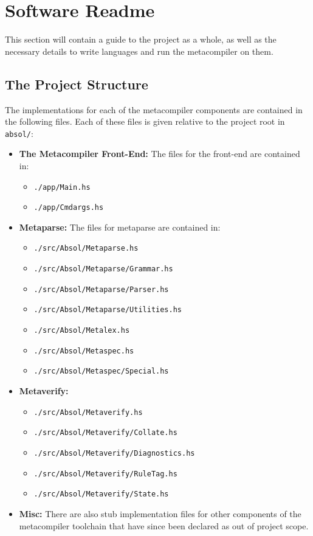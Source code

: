 \chapter{Software Readme} %
\label{cha:software_readme}
This section will contain a guide to the project as a whole, as well as the necessary details to write languages and run the metacompiler on them.

\section{The Project Structure} %
\label{sec:the_project_structure}
The implementations for each of the metacompiler components are contained in the following files. 
Each of these files is given relative to the project root in \texttt{absol/}:
\begin{itemize}
    \item \textbf{The Metacompiler Front-End:} The files for the front-end are contained in:
    \begin{itemize}
        \item \texttt{./app/Main.hs}
        \item \texttt{./app/Cmdargs.hs}
    \end{itemize}
    \item \textbf{Metaparse:} The files for metaparse are contained in:
    \begin{itemize}
        \item \texttt{./src/Absol/Metaparse.hs}
        \item \texttt{./src/Absol/Metaparse/Grammar.hs}
        \item \texttt{./src/Absol/Metaparse/Parser.hs}
        \item \texttt{./src/Absol/Metaparse/Utilities.hs}
        \item \texttt{./src/Absol/Metalex.hs}
        \item \texttt{./src/Absol/Metaspec.hs}
        \item \texttt{./src/Absol/Metaspec/Special.hs}
    \end{itemize}
    \item \textbf{Metaverify:} 
    \begin{itemize}
        \item \texttt{./src/Absol/Metaverify.hs}
        \item \texttt{./src/Absol/Metaverify/Collate.hs}
        \item \texttt{./src/Absol/Metaverify/Diagnostics.hs}
        \item \texttt{./src/Absol/Metaverify/RuleTag.hs}
        \item \texttt{./src/Absol/Metaverify/State.hs}
    \end{itemize}
    \item \textbf{Misc:} There are also stub implementation files for other components of the metacompiler toolchain that have since been declared as out of project scope. 
\end{itemize}

